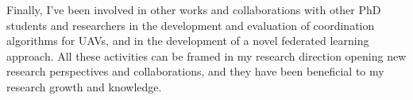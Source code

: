 \documentclass[runningheads]{llncs}
\begin{document}
Finally,
I've been involved in other works and collaborations with other PhD students and researchers
in the development and evaluation of coordination algorithms for UAVs,
and in the development of a novel federated learning approach.
%
All these activities can be framed in my research direction opening new research perspectives and collaborations,
and they have been beneficial to my research growth and knowledge.





\end{document}
